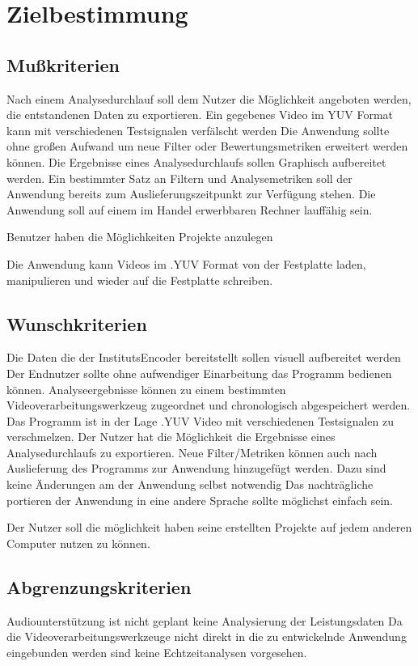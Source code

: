 \chapter{Zielbestimmung}

\section{Mußkriterien}

\newItemMK Nach einem Analysedurchlauf soll dem Nutzer die Möglichkeit angeboten werden, die entstandenen Daten zu exportieren. %
\newItemMK Ein gegebenes Video im YUV Format kann mit verschiedenen Testsignalen verfälscht werden %
\newItemMK Die Anwendung sollte ohne großen Aufwand um neue Filter oder Bewertungsmetriken erweitert werden können. %
\newItemMK Die Ergebnisse eines Analysedurchlaufs sollen Graphisch aufbereitet werden. %
\newItemMK Ein bestimmter Satz an Filtern und Analysemetriken soll der Anwendung bereits zum Auslieferungszeitpunkt zur Verfügung stehen.
\newItemMK Die Anwendung soll auf einem im Handel erwerbbaren Rechner lauffähig sein. %

\newItemMK Benutzer haben die Möglichkeiten Projekte anzulegen %

\newItemMK Die Anwendung kann Videos im .YUV Format von der Festplatte laden, manipulieren und wieder auf die Festplatte schreiben. %


\setcounter{enumi}{0}

\section{Wunschkriterien}

\newItemWK Die Daten die der InstitutsEncoder bereitstellt sollen visuell aufbereitet werden
\newItemWK Der Endnutzer sollte ohne aufwendiger Einarbeitung das Programm bedienen können.
\newItemWK Analyseergebnisse können zu einem bestimmten Videoverarbeitungswerkzeug zugeordnet und chronologisch abgespeichert werden.
\newItemWK Das Programm ist in der Lage .YUV Video mit verschiedenen Testsignalen zu verschmelzen.
\newItemWK Der Nutzer hat die Möglichkeit die Ergebnisse eines Analysedurchlaufs zu exportieren.
\newItemWK Neue Filter/Metriken können auch nach Auslieferung des Programms zur Anwendung hinzugefügt werden. Dazu
  sind keine Änderungen am der Anwendung selbst notwendig
\newItemWK Das nachträgliche portieren der Anwendung in eine andere Sprache sollte möglichst einfach sein.

\newItemWK Der Nutzer soll die möglichkeit haben seine erstellten Projekte auf jedem anderen Computer nutzen zu können.

\setcounter{enumi}{0}

\section{Abgrenzungskriterien}

\newItemAK Audiounterstützung ist nicht geplant
\newItemAK keine Analysierung der Leistungsdaten
\newItemAK Da die Videoverarbeitungswerkzeuge nicht direkt in die zu entwickelnde Anwendung eingebunden werden sind keine Echtzeitanalysen vorgesehen.


\setcounter{enumi}{0}
